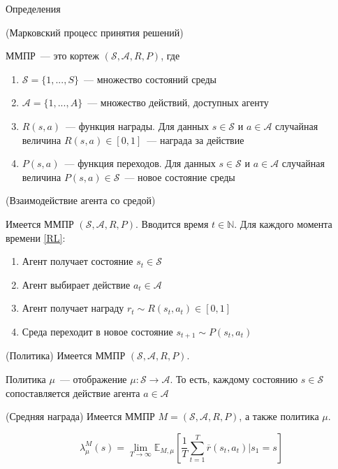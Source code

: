 \documentclass{beamer}
\newcommand{\E}{\mathbb{E}}
\newcommand{\N}{\mathbb{N}}
\newcommand{\Ss}{\mathcal{S}}
\newcommand{\A}{\mathcal{A}}
\begin{document}
\begin{frame}{Определения}
\begin{definition}{(Марковский процесс принятия решений)}
	
	ММПР~--- это кортеж $(\mathcal{S}, \mathcal{A}, R, P)$, где
	\begin{enumerate}
		\item $\mathcal{S}=\{1,...,S\}$~--- множество состояний среды
		\item $\mathcal{A}=\{1,...,A\}$~--- множество действий, доступных агенту
		\item $R(s,a)$~--- функция награды. Для данных $s\in \Ss$ и $a\in\A$ случайная величина $R(s, a)\in[0,1]$~--- награда за действие
		\item $P(s,a)$~--- функция переходов. Для данных $s\in \Ss$ и $a\in\A$ случайная величина $P(s, a)\in\Ss$~--- новое состояние среды
	\end{enumerate}
\end{definition}

\begin{definition}{(Взаимодействие агента со средой)}
	
	Имеется ММПР $(\Ss,\A,R,P)$. Вводится время $t\in\N$. Для каждого момента времени \ref{RL}:
	\begin{enumerate}
		\item Агент получает состояние $s_t\in \Ss$
		\item Агент выбирает действие $a_t\in\A$
		\item Агент получает награду $r_t\sim R(s_t,a_t)\in[0,1]$
		\item Среда переходит в новое состояние $s_{t+1}\sim P(s_t,a_t)$
	\end{enumerate}
\end{definition}

\begin{definition}{(Политика)}
	Имеется ММПР $(\Ss,\A,R,P)$.
	
	Политика $\mu$~--- отображение $\mu\colon \Ss\to\A$. То есть, каждому состоянию $s\in\Ss$ сопоставляется действие агента $a\in\A$
\end{definition}

\begin{definition}{(Средняя награда)}
	Имеется ММПР $M=(\Ss, \A,R,P)$, а также политика $\mu$.
	
	$$\lambda_{\mu}^M(s)=\lim\limits_{T\to\infty}\E_{M,\mu}\left[\frac{1}{T}\sum\limits_{t=1}^T\overline{r}(s_t,a_t)\big|s_1=s\right]$$
	

\end{definition}
\end{frame}
\end{document}

